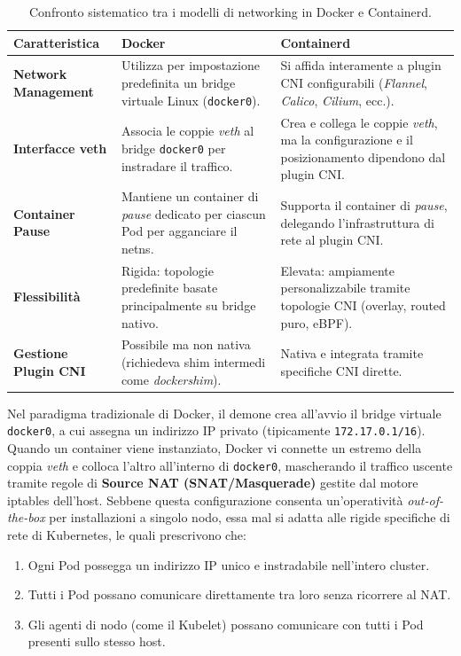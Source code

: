 \documentclass[11pt, a4paper]{article}
\begin{document}
\begin{table}[H]
\centering
\small
\begin{tabularx}{\textwidth}{l p{5.5cm} X}
\toprule
\textbf{Caratteristica} & \textbf{Docker} & \textbf{Containerd} \\
\midrule
\textbf{Network Management} & Utilizza per impostazione predefinita un bridge virtuale Linux (\texttt{docker0}). & Si affida interamente a plugin CNI configurabili (\emph{Flannel}, \emph{Calico}, \emph{Cilium}, ecc.). \\
\addlinespace
\textbf{Interfacce veth} & Associa le coppie \emph{veth} al bridge \texttt{docker0} per instradare il traffico. & Crea e collega le coppie \emph{veth}, ma la configurazione e il posizionamento dipendono dal plugin CNI. \\
\addlinespace
\textbf{Container Pause} & Mantiene un container di \emph{pause} dedicato per ciascun Pod per agganciare il netns. & Supporta il container di \emph{pause}, delegando l'infrastruttura di rete al plugin CNI. \\
\addlinespace
\textbf{Flessibilità} & Rigida: topologie predefinite basate principalmente su bridge nativo. & Elevata: ampiamente personalizzabile tramite topologie CNI (overlay, routed puro, eBPF). \\
\addlinespace
\textbf{Gestione Plugin CNI} & Possibile ma non nativa (richiedeva shim intermedi come \emph{dockershim}). & Nativa e integrata tramite specifiche CNI dirette. \\
\bottomrule
\end{tabularx}
\caption{Confronto sistematico tra i modelli di networking in Docker e Containerd.}
\label{tab:docker-vs-containerd}
\end{table}

Nel paradigma tradizionale di Docker, il demone crea all'avvio il bridge virtuale \texttt{docker0}, a cui assegna un indirizzo IP privato (tipicamente \texttt{172.17.0.1/16}). Quando un container viene instanziato, Docker vi connette un estremo della coppia \emph{veth} e colloca l'altro all'interno di \texttt{docker0}, mascherando il traffico uscente tramite regole di \textbf{Source NAT (SNAT/Masquerade)} gestite dal motore iptables dell'host. Sebbene questa configurazione consenta un'operatività \emph{out-of-the-box} per installazioni a singolo nodo, essa mal si adatta alle rigide specifiche di rete di Kubernetes, le quali prescrivono che:
\begin{enumerate}[noitemsep]
    \item Ogni Pod possegga un indirizzo IP unico e instradabile nell'intero cluster.
    \item Tutti i Pod possano comunicare direttamente tra loro senza ricorrere al NAT.
    \item Gli agenti di nodo (come il Kubelet) possano comunicare con tutti i Pod presenti sullo stesso host.
\end{enumerate}
\end{document}
